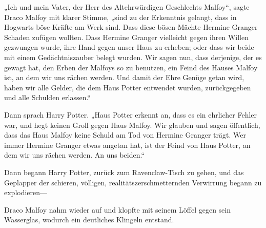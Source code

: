 „Ich und mein Vater, der Herr des Altehrwürdigen Geschlechts Malfoy“, sagte Draco Malfoy mit klarer Stimme, „sind zu der Erkenntnis gelangt, dass in Hogwarts böse Kräfte am Werk sind. Dass diese bösen Mächte Hermine Granger Schaden zufügen wollten. Dass Hermine Granger vielleicht gegen ihren Willen gezwungen wurde, ihre Hand gegen unser Haus zu erheben; oder dass wir beide mit einem Gedächtniszauber belegt wurden. Wir sagen nun, dass derjenige, der es gewagt hat, den Erben der Malfoys so zu benutzen, ein Feind des Hauses Malfoy ist, an dem wir uns rächen werden. Und damit der Ehre Genüge getan wird, haben wir alle Gelder, die dem Haus Potter entwendet wurden, zurückgegeben und alle Schulden erlassen.“

Dann sprach Harry Potter.
„Haus Potter erkennt an, dass es ein ehrlicher Fehler war, und hegt keinen Groll gegen Haus Malfoy. Wir glauben und sagen öffentlich, dass das Haus Malfoy keine Schuld am Tod von Hermine Granger trägt. Wer immer Hermine Granger etwas angetan hat, ist der Feind von Haus Potter, an dem wir uns rächen werden. An uns beiden.“

Dann begann Harry Potter, zurück zum Ravenclaw-Tisch zu gehen, und das Geplapper der schieren, völligen, realitätszerschmetternden Verwirrung begann zu explodieren—

Draco Malfoy nahm wieder auf und klopfte mit seinem Löffel gegen sein Wasserglas, wodurch ein deutliches Klingeln entstand.

